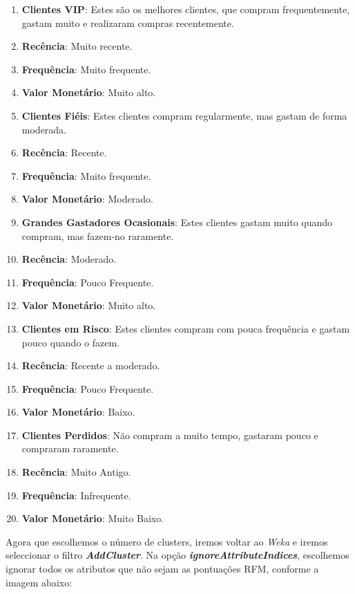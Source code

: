 \documentclass{easychair}
\begin{document}
\begin{enumerate}
    \item \textbf{Clientes VIP}: Estes são os melhores clientes, que compram frequentemente, gastam muito e realizaram compras recentemente.
		\item[\textbullet] \textbf{Recência}: Muito recente.
		\item[\textbullet] \textbf{Frequência}: Muito frequente.
		\item[\textbullet] \textbf{Valor Monetário}: Muito alto.
    \item \textbf{Clientes Fiéis}: Estes clientes compram regularmente, mas gastam de forma moderada.
		\item[\textbullet] \textbf{Recência}: Recente.
		\item[\textbullet] \textbf{Frequência}: Muito frequente.
		\item[\textbullet] \textbf{Valor Monetário}: Moderado.
    \item \textbf{Grandes Gastadores Ocasionais}: Estes clientes gastam muito quando compram, mas fazem-no raramente.
		\item[\textbullet] \textbf{Recência}: Moderado.
		\item[\textbullet] \textbf{Frequência}: Pouco Frequente.
		\item[\textbullet] \textbf{Valor Monetário}: Muito alto.
    \item \textbf{Clientes em Risco}: Estes clientes compram com pouca frequência e gastam pouco quando o fazem.
		\item[\textbullet] \textbf{Recência}: Recente a moderado.
		\item[\textbullet] \textbf{Frequência}: Pouco Frequente.
		\item[\textbullet] \textbf{Valor Monetário}: Baixo.
    \item \textbf{Clientes Perdidos}: Não compram a muito tempo, gastaram pouco e compraram raramente.
		\item[\textbullet] \textbf{Recência}: Muito Antigo.
		\item[\textbullet] \textbf{Frequência}: Infrequente.
		\item[\textbullet] \textbf{Valor Monetário}: Muito Baixo.
\end{enumerate}


Agora que escolhemos o número de clusters, iremos voltar ao \textit{Weka} e iremos seleccionar o filtro \textit{\textbf{AddCluster}}. Na opção \textit{\textbf{ignoreAttributeIndices}}, escolhemos ignorar todos os atributos que não sejam as pontuações RFM, conforme a imagem abaixo:
\end{document}
